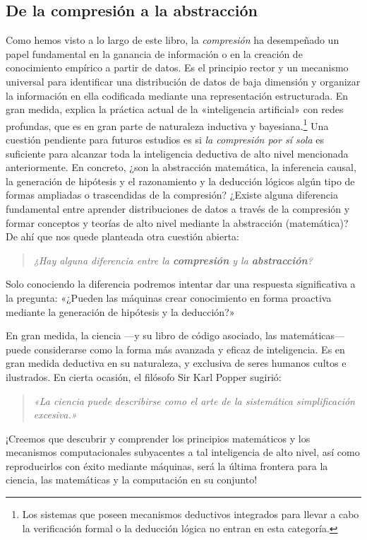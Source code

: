 \documentclass[../../book-main_es.tex]{subfiles}
\begin{document}
\subsection{De la compresión a la abstracción}
Como hemos visto a lo largo de este libro, la \textit{compresión} ha desempeñado
un papel fundamental en la ganancia de información o en la creación de conocimiento
empírico a partir de datos. Es el principio rector y un mecanismo universal para identificar una
distribución de datos de baja dimensión y organizar la información en ella codificada 
mediante una representación estructurada. En gran medida, explica la práctica actual de la
«inteligencia artificial» con redes profundas, que es en gran parte de naturaleza 
inductiva y bayesiana.\footnote{Los sistemas que poseen mecanismos deductivos integrados para 
llevar a cabo la verificación formal o la deducción lógica no entran en esta categoría.} Una cuestión pendiente para futuros
estudios es si \textit{la compresión por sí sola} es suficiente para alcanzar
toda la inteligencia deductiva de alto nivel mencionada anteriormente. 
En concreto, ¿son la abstracción matemática, la inferencia causal, la generación de hipótesis
y el razonamiento y la deducción lógicos algún tipo de formas ampliadas o
trascendidas de la compresión? ¿Existe alguna diferencia fundamental entre aprender distribuciones de datos 
a través de la compresión y formar conceptos y teorías de alto nivel mediante la abstracción (matemática)? De ahí que nos 
quede planteada otra cuestión abierta:
\begin{quote}
    \centering
    \textit{¿Hay alguna diferencia entre la \textbf{compresión} y
    la \textbf{abstracción}?}
\end{quote}
Solo conociendo la diferencia podremos intentar dar una respuesta significativa a la pregunta: 
«¿Pueden las máquinas crear conocimiento en forma proactiva mediante la generación de hipótesis y la deducción?»

En gran medida, la ciencia ---y su libro de código asociado, las matemáticas--- puede considerarse 
como la forma más avanzada y eficaz de inteligencia. Es en gran medida deductiva en su naturaleza, y exclusiva 
de seres humanos cultos e ilustrados. En cierta ocasión, el filósofo Sir Karl Popper sugirió:
\begin{quote}
    \centering
    \textit{«La ciencia puede describirse como el arte de la
    sistemática simplificación excesiva.»}
\end{quote}
¡Creemos que descubrir y comprender los principios matemáticos y los mecanismos computacionales subyacentes
a tal inteligencia de alto nivel, así como reproducirlos con éxito mediante máquinas,
será la última frontera para la ciencia, las matemáticas y la computación en su conjunto!
\end{document}
